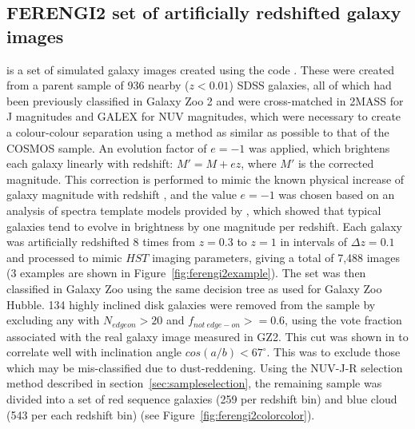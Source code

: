 \documentclass[useAMS,usenatbib]{mn2e}
\begin{document}
\subsection{FERENGI2 set of artificially redshifted galaxy images}
\label{ssec:ferengi}
 is a set of simulated galaxy images created using the \ferengi{} code \citep{Barden2008}. These were created from a parent sample of 936 nearby ($z<0.01$) SDSS galaxies, all of which had been previously classified in Galaxy Zoo 2 and were cross-matched in 2MASS \citep{Skrutskie2006} for J magnitudes and GALEX \citep{Martin2005} for NUV magnitudes, which were necessary to create a colour-colour separation using a method as similar as possible to that of the COSMOS sample.  An evolution factor of $e=-1$ was applied, which brightens each galaxy linearly with redshift: $M' = M + ez$, where $M'$ is the corrected magnitude. This correction is performed to mimic the known physical increase of galaxy magnitude with redshift \citep{Lilly1998,Loveday2011}, and the value $e=-1$ was chosen based on an analysis of spectra template models provided by \citet{Brinchmann2004a}, which showed that typical galaxies tend to evolve in brightness by one magnitude per redshift. Each galaxy was artificially redshifted 8 times from $z=0.3$ to $z=1$ in intervals of $\Delta z = 0.1$ and processed to mimic $HST$ imaging parameters, giving a total of 7,488 images (3 examples are shown in Figure~\ref{fig:ferengi2example}).  The set was then classified in Galaxy Zoo using the same decision tree as used for Galaxy Zoo Hubble. 134 highly inclined disk galaxies were removed from the sample by excluding any with $N_{edgeon}>20$ and $f_{not~edge-on}>=0.6$, using the vote fraction associated with the real galaxy image measured in GZ2. This cut was shown in \citet{Galloway2015} to correlate well with inclination angle $cos(a/b)<67^\circ$. This was to exclude those which may be mis-classified due to dust-reddening.  Using the NUV-J-R selection method described in section~\ref{sec:sampleselection}, the remaining sample was divided into a set of red sequence galaxies (259 per redshift bin) and blue cloud (543 per each redshift bin) (see Figure~\ref{fig:ferengi2colorcolor}).
\end{document}
